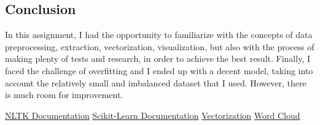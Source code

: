 \documentclass{article}
\begin{document}
\subsection{Conclusion}
In this assignment, I had the opportunity to familiarize with the concepts of data preprocessing, extraction, vectorization, visualization, but also with the process of making plenty of tests and research, in order to achieve the best result. Finally, I faced the challenge of overfitting and I ended up with a decent model, taking into account the relatively small and imbalanced dataset that I used. However, there is much room for improvement.
\begin{thebibliography}{9}
\bibitem{}
\href{https://www.nltk.org/}{NLTK Documentation}
\bibitem{}
\href{https://scikit-learn.org/stable/}{Scikit-Learn Documentation}
\bibitem{}
\href{https://kavita-ganesan.com/tfidftransformer-tfidfvectorizer-usage-differences/#.YZPe0mBBwuV}{Vectorization}
\bibitem{}
\href{https://www.datacamp.com/community/tutorials/wordcloud-python}{Word Cloud}
\end{thebibliography}
\end{document}
